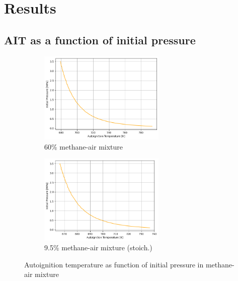\documentclass[a4paper,11pt]{article}
\begin{document}
    \section{Results}
    
    \subsection{AIT as a function of initial pressure}
    
\begin{figure}[h]
\begin{subfigure}{.5\textwidth}
\centering
\includegraphics[width=6cm]{1metan60.png}
\caption{60\% methane-air mixture}
\end{subfigure}
\begin{subfigure}{.5\textwidth}
\centering
\includegraphics[width=6cm]{1metan9.5.png}
\caption{9.5\% methane-air mixture (stoich.)}
\end{subfigure}
\caption{Autoignition temperature as function of initial pressure in methane-air mixture}
\end{figure}
\end{document}
